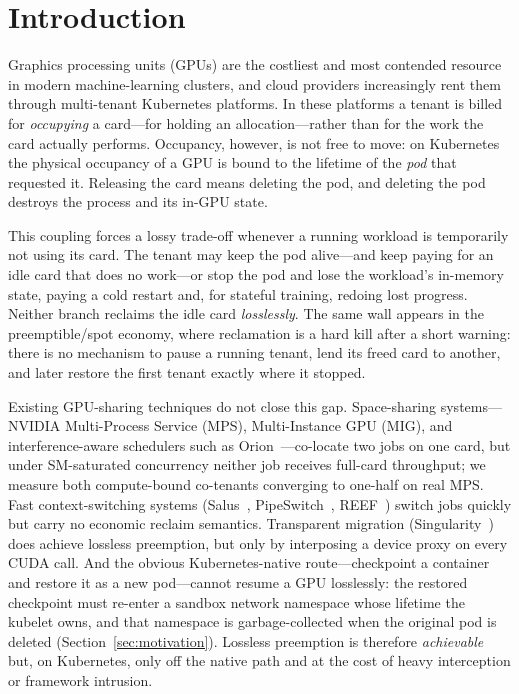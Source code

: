 \documentclass[preprint,12pt]{elsarticle}
\begin{document}
\section{Introduction}
\label{sec:intro}

Graphics processing units (GPUs) are the costliest and most contended resource in modern machine-learning
clusters, and cloud providers increasingly rent them through multi-tenant Kubernetes platforms. In these
platforms a tenant is billed for \emph{occupying} a card---for holding an allocation---rather than for the
work the card actually performs. Occupancy, however, is not free to move: on Kubernetes the physical
occupancy of a GPU is bound to the lifetime of the \emph{pod} that requested it. Releasing the card means
deleting the pod, and deleting the pod destroys the process and its in-GPU state.

This coupling forces a lossy trade-off whenever a running workload is temporarily not using its card. The
tenant may keep the pod alive---and keep paying for an idle card that does no work---or stop the pod and
lose the workload's in-memory state, paying a cold restart and, for stateful training, redoing lost
progress. Neither branch reclaims the idle card \emph{losslessly}. The same wall appears in the
preemptible/spot economy, where reclamation is a hard kill after a short warning: there is no mechanism to
pause a running tenant, lend its freed card to another, and later restore the first tenant exactly where it
stopped.

Existing GPU-sharing techniques do not close this gap. Space-sharing systems---NVIDIA Multi-Process Service
(MPS), Multi-Instance GPU (MIG), and interference-aware schedulers such as Orion~\cite{orion}---co-locate
two jobs on one card, but under SM-saturated concurrency neither job receives full-card throughput; we
measure both compute-bound co-tenants converging to one-half on real MPS. Fast context-switching systems
(Salus~\cite{salus}, PipeSwitch~\cite{pipeswitch}, REEF~\cite{reef}) switch jobs quickly but carry no
economic reclaim semantics. Transparent migration (Singularity~\cite{singularity}) does achieve lossless
preemption, but only by interposing a device proxy on every CUDA call. And the obvious Kubernetes-native
route---checkpoint a container and restore it as a new pod---cannot resume a GPU losslessly: the restored
checkpoint must re-enter a sandbox network namespace whose lifetime the kubelet owns, and that namespace is
garbage-collected when the original pod is deleted (Section~\ref{sec:motivation}). Lossless preemption is
therefore \emph{achievable} but, on Kubernetes, only off the native path and at the cost of heavy
interception or framework intrusion.
\end{document}
